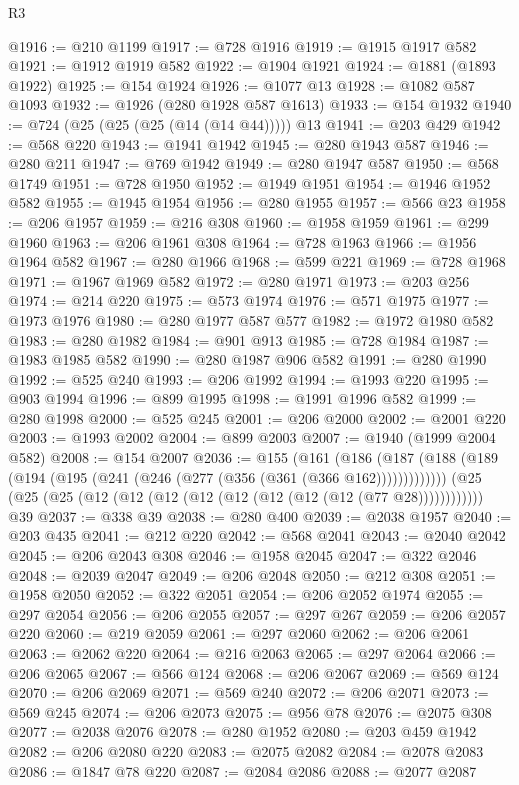 \begin{lexlean}{R3}
\begin{coremodule}
@1916 := @210 @1199
@1917 := @728 @1916
@1919 := @1915 @1917 @582
@1921 := @1912 @1919 @582
@1922 := @1904 @1921
@1924 := @1881 (@1893 @1922)
@1925 := @154 @1924
@1926 := @1077 @13
@1928 := @1082 @587 @1093
@1932 := @1926 (@280 @1928 @587 @1613)
@1933 := @154 @1932
@1940 := @724 (@25 (@25 (@25 (@14 (@14 @44))))) @13
@1941 := @203 @429
@1942 := @568 @220
@1943 := @1941 @1942
@1945 := @280 @1943 @587
@1946 := @280 @211
@1947 := @769 @1942
@1949 := @280 @1947 @587
@1950 := @568 @1749
@1951 := @728 @1950
@1952 := @1949 @1951
@1954 := @1946 @1952 @582
@1955 := @1945 @1954
@1956 := @280 @1955
@1957 := @566 @23
@1958 := @206 @1957
@1959 := @216 @308
@1960 := @1958 @1959
@1961 := @299 @1960
@1963 := @206 @1961 @308
@1964 := @728 @1963
@1966 := @1956 @1964 @582
@1967 := @280 @1966
@1968 := @599 @221
@1969 := @728 @1968
@1971 := @1967 @1969 @582
@1972 := @280 @1971
@1973 := @203 @256
@1974 := @214 @220
@1975 := @573 @1974
@1976 := @571 @1975
@1977 := @1973 @1976
@1980 := @280 @1977 @587 @577
@1982 := @1972 @1980 @582
@1983 := @280 @1982
@1984 := @901 @913
@1985 := @728 @1984
@1987 := @1983 @1985 @582
@1990 := @280 @1987 @906 @582
@1991 := @280 @1990
@1992 := @525 @240
@1993 := @206 @1992
@1994 := @1993 @220
@1995 := @903 @1994
@1996 := @899 @1995
@1998 := @1991 @1996 @582
@1999 := @280 @1998
@2000 := @525 @245
@2001 := @206 @2000
@2002 := @2001 @220
@2003 := @1993 @2002
@2004 := @899 @2003
@2007 := @1940 (@1999 @2004 @582)
@2008 := @154 @2007
@2036 := @155
    (@161 (@186 (@187 (@188 (@189 (@194 (@195 (@241 (@246 (@277 (@356 (@361 (@366 @162)))))))))))))
    (@25 (@25 (@25 (@12 (@12 (@12 (@12 (@12 (@12 (@12 (@12 (@77 @28))))))))))))
    @39
@2037 := @338 @39
@2038 := @280 @400
@2039 := @2038 @1957
@2040 := @203 @435
@2041 := @212 @220
@2042 := @568 @2041
@2043 := @2040 @2042
@2045 := @206 @2043 @308
@2046 := @1958 @2045
@2047 := @322 @2046
@2048 := @2039 @2047
@2049 := @206 @2048
@2050 := @212 @308
@2051 := @1958 @2050
@2052 := @322 @2051
@2054 := @206 @2052 @1974
@2055 := @297 @2054
@2056 := @206 @2055
@2057 := @297 @267
@2059 := @206 @2057 @220
@2060 := @219 @2059
@2061 := @297 @2060
@2062 := @206 @2061
@2063 := @2062 @220
@2064 := @216 @2063
@2065 := @297 @2064
@2066 := @206 @2065
@2067 := @566 @124
@2068 := @206 @2067
@2069 := @569 @124
@2070 := @206 @2069
@2071 := @569 @240
@2072 := @206 @2071
@2073 := @569 @245
@2074 := @206 @2073
@2075 := @956 @78
@2076 := @2075 @308
@2077 := @2038 @2076
@2078 := @280 @1952
@2080 := @203 @459 @1942
@2082 := @206 @2080 @220
@2083 := @2075 @2082
@2084 := @2078 @2083
@2086 := @1847 @78 @220
@2087 := @2084 @2086
@2088 := @2077 @2087

\end{coremodule}
\end{lexlean}
